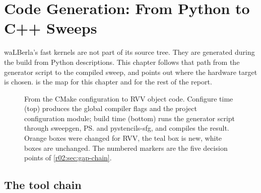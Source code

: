 \chapter{Code Generation: From Python to C++ Sweeps}\label{r02:ch:codegen}

waLBerla's fast kernels are not part of its source tree. They are generated during the
build from Python descriptions. This chapter follows that path from the generator
script to the compiled sweep, and points out where the hardware target is chosen.
 is the map for this chapter and for the rest of the report.

\begin{figure}[htbp]
  \centering
  \resizebox{\linewidth}{!}{}
  \caption[From CMake configuration to RVV object code]{From the CMake configuration to
    RVV object code. Configure time (top) produces the global compiler flags and the
    project configuration module; build time (bottom) runs the generator script through
    sweepgen, \ps{} and pystencils-sfg, and compiles the result. Orange boxes were
    changed for RVV, the teal box is new, white boxes are unchanged. The numbered
    markers are the five decision points of \cref{r02:sec:gap-chain}.}
  \label{r02:fig:build-flow}
\end{figure}

\section{The tool chain}\label{r02:sec:toolchain}

